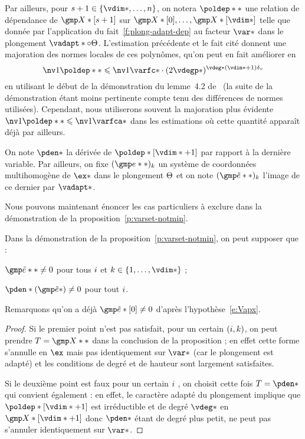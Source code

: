 Par ailleurs, pour \( \indi \in \set{\vdim*, \dots, \dimp} \), on notera \(
  \poldep** \) \label{p:def-poldep} une relation de dépendance de \(
  \vmp*[\indi] \) sur \(
  \vmp*[0], \dots, \vmp*[\vdim*] \) telle que donnée par l'application du
fait~\vref{f:plong-adapt-dep} au facteur \( \var* \) dans le plongement \(
  \vadapt* \circ \vaemb \). L'estimation précédente et le fait cité donnent
une majoration des normes locales de ces polynômes, qu'on peut en fait
améliorer en
\begin{equation} \label{e:nv-poldep}
  \nv1{\poldep**} \le \nv1{\varfc*}
  \cdot ( 2 \vdegp* )^{\vdeg* (\vdim* + 1) \dv}
\end{equation}
en utilisant le début de la démonstration du lemme~4.2 de~\cite{remivds} (la
suite de la démonstration étant moins pertinente compte tenu des différences
de normes utilisées). Cependant, nous utiliserons souvent la majoration plus
évidente \( \nv1{\poldep**} \le \nv1{\varfca*} \) dans les estimations où
cette quantité apparaît déjà par ailleurs.

\begin{nota} \label{n:pden-cexa}
  On note \( \pden* \) la dérivée de \( \poldep*[\vdim*+1] \) par rapport à la
  dernière variable.  Par ailleurs, on fixe \( (\cex**)_\ind \) un système de
  coordonnées multihomogène de \( \ex* \) dans le plongement \( \Theta \) et
  on note \( (\cexa**)_\ind \) l'image de ce dernier par \( \vadapt* \).
\end{nota}

Nous pouvons maintenant énoncer les cas particuliers à exclure dans la
démonstration de la proposition~\vref{p:varset-notmin}.

\begin{sco} \label{s:part-cases}
  Dans la démonstration de la proposition~\vref{p:varset-notmin}, on peut
  supposer que :
  \begin{enumthm}
    \item \( \cexa** \neq 0 \) pour tous \( i \) et \( \ind \in \set{1,
          \dots, \vdim*} \) ;
    \item \( \pden*(\cexa*) \neq 0 \) pour tout \( i \).
  \end{enumthm}
  Remarquons qu'on a déjà \( \cexa*[0] \neq 0 \) d'après
  l'hypothèse~\eqref{e:Vapx}.
\end{sco}

\begin{proof}
  Si le premier point n'est pas satisfait, pour un certain \( (i, k) \),
  on peut prendre \( T = \vmp** \) dans la conclusion de la
  proposition ; en effet cette forme s'annulle en \( \ex \) mais pas
  identiquement sur \( \var* \) (car le plongement est adapté) et les
  conditions de degré et de hauteur sont largement satisfaites.

  Si le deuxième point est faux pour un certain \( i \) , on choisit cette
  fois \( T = \pden* \) qui convient également : en effet, le caractère adapté
  du plongement implique que \( \poldep*[\vdim*+1] \) est irréductible et de
  degré \( \vdeg* \) en \( \vmp*[\vdim*+1] \) donc \( \pden* \) étant de degré
  plus petit, ne peut pas s'annuler identiquement sur \( \var* \).
\end{proof}


